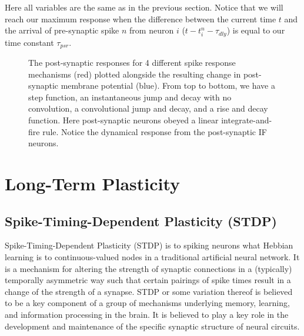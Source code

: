 Here all variables are the same as in the previous section. Notice that we will reach our maximum response when the difference between the current time $t$ and the arrival of pre-synaptic spike $n$ from neuron $i$ ($t-t^n_i - \tau_{dly}$) is equal to our time constant $\tau_{psr}$.

\begin{figure}[h]
\centering
{}
\caption[Simbrain screenshot by Zo\"e Tosi]{The post-synaptic responses for 4 different spike response mechanisms (red) plotted alongside the resulting change in post-synaptic membrane potential (blue). From top to bottom, we have a step function, an instantaneous jump and decay with no convolution, a convolutional jump and decay, and a rise and decay function. Here post-synaptic neurons obeyed a linear integrate-and-fire rule. Notice the dynamical response from the post-synaptic IF neurons. }
\label{SR_Traces}
\end{figure}


\section{Long-Term Plasticity}

\subsection{Spike-Timing-Dependent Plasticity (STDP)}

Spike-Timing-Dependent Plasticity (STDP) is to spiking neurons what Hebbian learning is to continuous-valued nodes in a traditional artificial neural network. It is a mechanism for altering the strength of synaptic connections in a (typically) temporally asymmetric way such that certain pairings of spike times result in a change of the strength of a synapse. STDP or some variation thereof is believed to be a key component of a group of mechanisms underlying memory, learning, and information processing in the brain. It is believed to play a key role in the development and maintenance of the specific synaptic structure of neural circuits.

